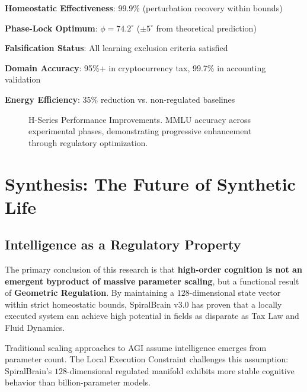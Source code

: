 \documentclass[12pt,a4paper]{report}
\newcommand{\phiU}{\phi}
\begin{document}
\textbf{Homeostatic Effectiveness}: 99.9\% (perturbation recovery within bounds)  

\textbf{Phase-Lock Optimum}: $\phiU = 74.2^\circ$ ($\pm 5^\circ$ from theoretical prediction)  

\textbf{Falsification Status}: All learning exclusion criteria satisfied  

\textbf{Domain Accuracy}: 95\%+ in cryptocurrency tax, 99.7\% in accounting validation  

\textbf{Energy Efficiency}: 35\% reduction vs. non-regulated baselines

\begin{figure}[ht]
\centering
{}
\caption{H-Series Performance Improvements. MMLU accuracy across experimental phases, demonstrating progressive enhancement through regulatory optimization.}
\label{fig:h-series}
\end{figure}

\chapter{Synthesis: The Future of Synthetic Life}

\section{Intelligence as a Regulatory Property}

The primary conclusion of this research is that \textbf{high-order cognition is not an emergent byproduct of massive parameter scaling}, but a functional result of \textbf{Geometric Regulation}. By maintaining a $128$-dimensional state vector within strict homeostatic bounds, SpiralBrain v3.0 has proven that a locally executed system can achieve high potential in fields as disparate as Tax Law and Fluid Dynamics.

Traditional scaling approaches to AGI assume intelligence emerges from parameter count. The Local Execution Constraint challenges this assumption: SpiralBrain's $128$-dimensional regulated manifold exhibits more stable cognitive behavior than billion-parameter models.
\end{document}
